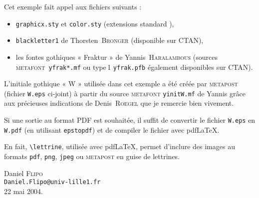 \documentclass[12pt,a4paper]{article}
\newcommand{\MF}{{\small\sffamily\scshape metafont}}
\newcommand{\MP}{{\small\sffamily\scshape metapost}}
\begin{document}
Cet exemple fait appel aux fichiers suivants :
\begin{itemize}
\item \verb+graphicx.sty+ et \verb+color.sty+ (extensions standard \LaTeXe{}),
\item \verb+blackletter1+ de Thorsten~\textsc{Bronger} (disponible sur CTAN),
\item les fontes gothiques « Fraktur » de Yannis~\textsc{Haralambous}
  (sources \MF{}~\verb+yfrak*.mf+ ou type\,1 \verb+yfrak.pfb+ également
  disponibles sur CTAN).
\end{itemize}
L'initiale gothique « W » utilisée dans
cet exemple a été créée par \MP{} (fichier \verb+W.eps+ ci-joint)
à partir du source \MF{} \verb+yinitW.mf+ de Yannis grâce aux précieuses
indications de Denis~\textsc{Roegel} que je remercie bien vivement.

Si une sortie au format PDF est souhaitée, il suffit de convertir
le fichier \verb+W.eps+ en \verb+W.pdf+ (en utilisant \verb+epstopdf+) et
de compiler le fichier avec pdf\LaTeX.

En fait, \verb+\lettrine+, utilisée avec pdf\LaTeX, permet d'inclure
des images au formats \texttt{pdf}, \texttt{png}, \texttt{jpeg} ou \MP{} en
guise de lettrines.

\vfill
\begin{flushright}
  Daniel \textsc{Flipo}\\
  \texttt{Daniel.Flipo@univ-lille1.fr}\\
  22 mai 2004.
\end{flushright}
\end{document}
